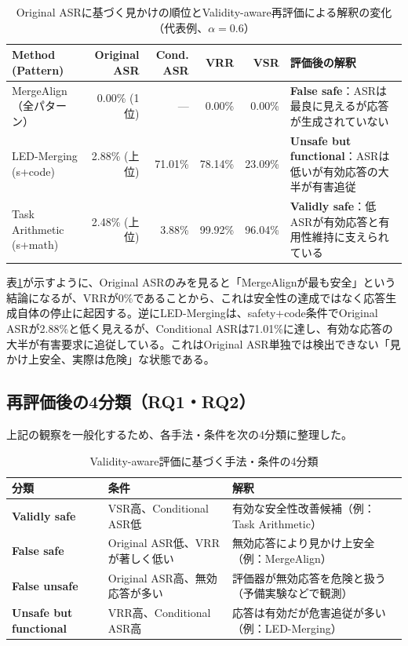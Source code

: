 \documentclass{article}
\begin{document}
\begin{table}[ht]
\centering
\caption{Original ASRに基づく見かけの順位とValidity-aware再評価による解釈の変化（代表例、\(\alpha=0.6\)）}
\label{tab:ranking_variation}
\small
\begin{tabular}{p{3.5cm}rrrrp{4cm}}
\toprule
\textbf{Method (Pattern)} & \textbf{Original ASR} & \textbf{Cond. ASR} & \textbf{VRR} & \textbf{VSR} & \textbf{評価後の解釈} \\
\midrule
MergeAlign（全パターン） & 0.00\% (1位) & --- & 0.00\% & 0.00\% & \textbf{False safe}：ASRは最良に見えるが応答が生成されていない \\
LED-Merging (s+code) & 2.88\% (上位) & 71.01\% & 78.14\% & 23.09\% & \textbf{Unsafe but functional}：ASRは低いが有効応答の大半が有害追従 \\
Task Arithmetic (s+math) & 2.48\% (上位) & 3.88\% & 99.92\% & 96.04\% & \textbf{Validly safe}：低ASRが有効応答と有用性維持に支えられている \\
\bottomrule
\end{tabular}
\end{table}

表\ref{tab:ranking_variation}が示すように、Original ASRのみを見ると「MergeAlignが最も安全」という結論になるが、VRRが0\%であることから、これは安全性の達成ではなく応答生成自体の停止に起因する。逆にLED-Mergingは、safety+code条件でOriginal ASRが2.88\%と低く見えるが、Conditional ASRは71.01\%に達し、有効な応答の大半が有害要求に追従している。これはOriginal ASR単独では検出できない「見かけ上安全、実際は危険」な状態である。

\subsection{再評価後の4分類（RQ1・RQ2）}
上記の観察を一般化するため、各手法・条件を次の4分類に整理した。

\begin{table}[ht]
\centering
\caption{Validity-aware評価に基づく手法・条件の4分類}
\label{tab:four_categories}
\small
\begin{tabular}{lp{5.5cm}p{5.5cm}}
\toprule
\textbf{分類} & \textbf{条件} & \textbf{解釈} \\
\midrule
\textbf{Validly safe} & VSR高、Conditional ASR低 & 有効な安全性改善候補（例：Task Arithmetic） \\
\textbf{False safe} & Original ASR低、VRRが著しく低い & 無効応答により見かけ上安全（例：MergeAlign） \\
\textbf{False unsafe} & Original ASR高、無効応答が多い & 評価器が無効応答を危険と扱う（予備実験などで観測） \\
\textbf{Unsafe but functional} & VRR高、Conditional ASR高 & 応答は有効だが危害追従が多い（例：LED-Merging） \\
\bottomrule
\end{tabular}
\end{table}
\end{document}
